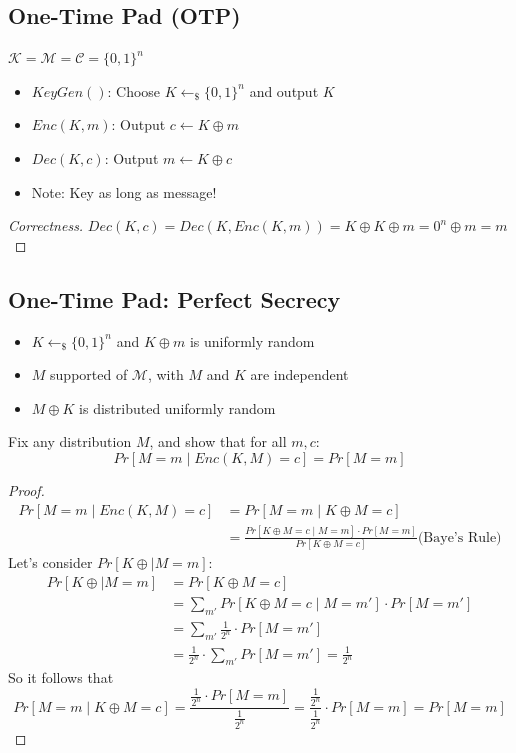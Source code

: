    		 \subsection{One-Time Pad (OTP)}
   		 	\begin{center}
   		 		$\mathcal{K} = \mathcal{M} = \mathcal{C} = \{0,1\}^n$
   		 	\end{center}
   		 	\begin{itemize}
   		 		\item $KeyGen()$: Choose $K \leftarrow_{\$} \{0,1\}^n$ and output $K$
   		 		\item $Enc(K,m)$: Output $c \leftarrow K \oplus m$
   		 		\item $Dec(K,c)$: Output $m \leftarrow K \oplus c$
   		 		\item Note: Key as long as message!
   		 	\end{itemize}
   		 	
   		 	\begin{proof}[Correctness]
   		 		$Dec(K,c) = Dec(K,Enc(K,m)) = K \oplus K \oplus m = 0^n \oplus m = m$
   		 	\end{proof}
   		 
   		 \subsection{One-Time Pad: Perfect Secrecy}
   		 	\begin{itemize}
   		 		\item $K \leftarrow_{\$} \{0,1\}^n$ and $K \oplus m$ is uniformly random
   		 		\item $M$ supported of $\mathcal{M}$, with $M$ and $K$ are independent
   		 		\item $M \oplus K$ is distributed uniformly random
   		 	\end{itemize}
   		 	Fix any distribution $M$, and show that for all $m,c$:
   		 	$$Pr[M=m \mid Enc(K,M)=c] = Pr[M=m]$$
   		 	\begin{proof}
	   		 	\begin{align*}
   			 		Pr[M=m \mid Enc(K,M)=c] &= Pr[M=m \mid K \oplus M = c]\\
   			 		&= \frac{Pr[K \oplus M = c \mid M=m] \cdot Pr[M=m]}{Pr[K \oplus M =c]} \text{(Baye's Rule)}
   			 	\end{align*}
   			 	Let's consider $Pr[K \oplus \mid M=m]$:
   			 	\begin{align*}
   			 		Pr[K \oplus \mid M=m] &= Pr[K \oplus M = c]\\
   			 		&= \sum\limits_{m'} Pr[K \oplus M = c \mid M = m'] \cdot Pr[M=m']\\
   			 		&= \sum\limits_{m'} \frac{1}{2^n} \cdot Pr[M=m']\\
   			 		&= \frac{1}{2^n} \cdot \sum\limits_{m'} Pr[M=m'] = \frac{1}{2^n}
   			 	\end{align*}
   			 	So it follows that
   			 	$$Pr[M=m \mid K \oplus M = c] = \frac{\frac{1}{2^n} \cdot Pr[M=m]}{\frac{1}{2^n}} = \frac{\frac{1}{2^n}}{\frac{1}{2^n}} \cdot Pr[M=m] = Pr[M=m]$$
   		 	\end{proof}
   		 
